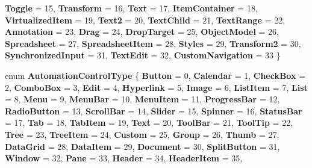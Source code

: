 \begin{DoxyCompactItemize}
{\bfseries Toggle} = 15, 
\newline
{\bfseries Transform} = 16, 
{\bfseries Text} = 17, 
{\bfseries Item\+Container} = 18, 
{\bfseries Virtualized\+Item} = 19, 
\newline
{\bfseries Text2} = 20, 
{\bfseries Text\+Child} = 21, 
{\bfseries Text\+Range} = 22, 
{\bfseries Annotation} = 23, 
\newline
{\bfseries Drag} = 24, 
{\bfseries Drop\+Target} = 25, 
{\bfseries Object\+Model} = 26, 
{\bfseries Spreadsheet} = 27, 
\newline
{\bfseries Spreadsheet\+Item} = 28, 
{\bfseries Styles} = 29, 
{\bfseries Transform2} = 30, 
{\bfseries Synchronized\+Input} = 31, 
\newline
{\bfseries Text\+Edit} = 32, 
{\bfseries Custom\+Navigation} = 33
 \}
\item 
\mbox{\label{namespace_windows_1_1_u_i_1_1_xaml_1_1_automation_1_1_peers_a545d04e5cb3e01155ab597d749495a0f}} 
enum {\bfseries Automation\+Control\+Type} \{ \newline
{\bfseries Button} = 0, 
{\bfseries Calendar} = 1, 
{\bfseries Check\+Box} = 2, 
{\bfseries Combo\+Box} = 3, 
\newline
{\bfseries Edit} = 4, 
{\bfseries Hyperlink} = 5, 
{\bfseries Image} = 6, 
{\bfseries List\+Item} = 7, 
\newline
{\bfseries List} = 8, 
{\bfseries Menu} = 9, 
{\bfseries Menu\+Bar} = 10, 
{\bfseries Menu\+Item} = 11, 
\newline
{\bfseries Progress\+Bar} = 12, 
{\bfseries Radio\+Button} = 13, 
{\bfseries Scroll\+Bar} = 14, 
{\bfseries Slider} = 15, 
\newline
{\bfseries Spinner} = 16, 
{\bfseries Status\+Bar} = 17, 
{\bfseries Tab} = 18, 
{\bfseries Tab\+Item} = 19, 
\newline
{\bfseries Text} = 20, 
{\bfseries Tool\+Bar} = 21, 
{\bfseries Tool\+Tip} = 22, 
{\bfseries Tree} = 23, 
\newline
{\bfseries Tree\+Item} = 24, 
{\bfseries Custom} = 25, 
{\bfseries Group} = 26, 
{\bfseries Thumb} = 27, 
\newline
{\bfseries Data\+Grid} = 28, 
{\bfseries Data\+Item} = 29, 
{\bfseries Document} = 30, 
{\bfseries Split\+Button} = 31, 
\newline
{\bfseries Window} = 32, 
{\bfseries Pane} = 33, 
{\bfseries Header} = 34, 
{\bfseries Header\+Item} = 35, 
\newline

\end{DoxyCompactItemize}
